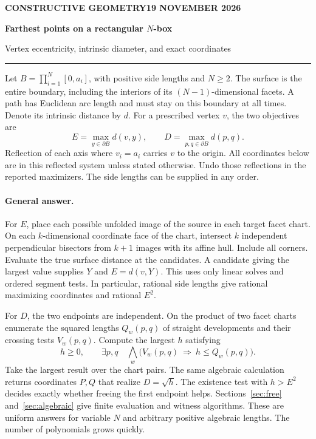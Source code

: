 \documentclass[10pt,letterpaper]{article}
\newcommand{\cB}{\partial B}
\begin{document}
\thispagestyle{empty}
{\sffamily\small\color{tealink}\bfseries CONSTRUCTIVE GEOMETRY\hfill 19 NOVEMBER 2026\par}
\vspace{1em}
{\Huge\sffamily\bfseries\color{ink} Farthest points on a rectangular \(N\)-box\par}
\vspace{.45em}
{\Large\sffamily\color{muted} Vertex eccentricity, intrinsic diameter, and exact coordinates\par}
\vspace{.8em}\hrule\vspace{.8em}
Let $B=\prod_{i=1}^N[0,a_i]$, with positive side lengths and $N\ge2$.
The surface is the entire boundary, including the interiors of its $(N-1)$-dimensional facets. A path has Euclidean arc length and must stay on this boundary at all times. Denote its intrinsic distance by $d$. For a prescribed vertex $v$, the two objectives are
\[
 E=\max_{y\in\cB}d(v,y),\qquad D=\max_{p,q\in\cB}d(p,q).
\]
Reflection of each axis where $v_i=a_i$ carries $v$ to the origin. All coordinates below are in this reflected system unless stated otherwise. Undo those reflections in the reported maximizers. The side lengths can be supplied in any order.
\paragraph{General answer.}
For $E$, place each possible unfolded image of the source in each target facet chart. On each $k$-dimensional coordinate face of the chart, intersect $k$ independent perpendicular bisectors from $k+1$ images with its affine hull. Include all corners. Evaluate the true surface distance at the candidates. A candidate giving the largest value supplies $Y$ and $E=d(v,Y)$. This uses only linear solves and ordered segment tests. In particular, rational side lengths give rational maximizing coordinates and rational $E^2$.
\par For $D$, the two endpoints are independent. On the product of two facet charts enumerate the squared lengths $Q_w(p,q)$ of straight developments and their crossing tests $V_w(p,q)$. Compute the largest $h$ satisfying
\[
   h\ge0,\qquad \exists p,q\quad
         \bigwedge_w\bigl(V_w(p,q)\ \Longrightarrow\ h\le Q_w(p,q)\bigr).
\]
Take the largest result over the chart pairs. The same algebraic calculation returns coordinates $P,Q$ that realize $D=\sqrt h$. The existence test with $h>E^2$ decides exactly whether freeing the first endpoint helps. Sections~\ref{sec:free} and~\ref{sec:algebraic} give finite evaluation and witness algorithms. These are uniform answers for variable $N$ and arbitrary positive algebraic lengths. The number of polynomials grows quickly.
\end{document}

